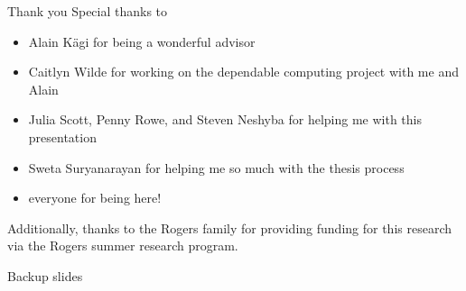 \documentclass{beamer}
\begin{document}
\begin{frame}{Thank you}
    Special thanks to
    \begin{itemize}
        \item Alain K{\"a}gi for being a wonderful advisor
        \item Caitlyn Wilde for working on the dependable computing project with me and Alain
        \item Julia Scott, Penny Rowe, and Steven Neshyba for helping me with this presentation
        \item Sweta Suryanarayan for helping me so much with the thesis process
        \item everyone for being here!
    \end{itemize}

    Additionally, thanks to the Rogers family for providing funding for this research via the
    Rogers summer research program.
\end{frame}




\begin{frame}{Backup slides}
    
\end{frame}
\end{document}

